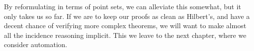 By reformulating in terms of point sets, we can alleviate this somewhat, but it only takes us so far. If we are to keep our proofs as clean as Hilbert's, and have a decent chance of verifying more complex theorems, we will want to make almost all the incidence reasoning implicit. This we leave to the next chapter, where we consider automation.


